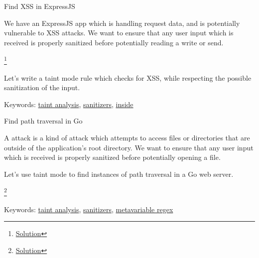 \documentclass[aspectratio=169, handout]{beamer}
\newenvironment{exercisePage}[1]{
  \begin{minipage}[t][0.4in][t]{\textwidth}
    \Large \term{Exercise:} #1
  \end{minipage}
  \begin{minipage}[t][2.6in][t]{\textwidth}
}{
  \end{minipage}
}
\newcommand\blfootnote[1]{
    \begingroup
    \renewcommand\thefootnote{}\footnote{#1}
    \addtocounter{footnote}{-1}
    \endgroup
}
\newcommand\solutionLink[1]{
  \blfootnote{\color{blue}\href{#1}{Solution}}
}
\newcommand\patternInsideLink[1][]{{\color{blue}\href{https://semgrep.dev/docs/writing-rules/rule-syntax\#pattern-inside}{inside}}}
\newcommand\metavariableRegexLink[1][]{{\color{blue}\href{https://semgrep.dev/docs/writing-rules/rule-syntax\#metavariable-regex}{metavariable regex}}}
\newcommand\taintLink[1][]{{\color{blue}\href{https://semgrep.dev/docs/writing-rules/data-flow/taint-mode}{taint analysis}}}
\newcommand\sanitizerLink[1][]{{\color{blue}\href{https://semgrep.dev/docs/writing-rules/data-flow/taint-mode\#sanitizers}{sanitizers}}}
\begin{document}
\begin{frame}[fragile]
  \begin{exercisePage}{Find XSS in ExpressJS}

  We have an ExpressJS app which is handling request data, and is potentially vulnerable
  to XSS attacks. We want to ensure that any user input which is received is properly
  sanitized before potentially reading a write or send.
  \solutionLink{https://semgrep.dev/playground/r/JDUNYAr/semgrep.express-taint-solution}

  \vspace{\fill}

  Let's write a taint mode rule which checks for XSS, while respecting the possible
  sanitization of the input.

  \vspace{\fill}

  Keywords: \taintLink, \sanitizerLink, \patternInsideLink
  \end{exercisePage}
\end{frame}

\begin{frame}[fragile]
  \begin{exercisePage}{Find path traversal in Go}

  A  attack is a kind of attack which attempts to access files
  or directories that are outside of the application's root directory. We want to
  ensure that any user input which is received is properly sanitized before potentially
  opening a file.

  \vspace{\fill}

  Let's use taint mode to find instances of path traversal in a Go web server.
  \solutionLink{https://semgrep.dev/playground/r/5rUd20G/semgrep.net-http-path-traversal-taint-solution}

  \vspace{\fill}

  Keywords: \taintLink, \sanitizerLink, \metavariableRegexLink
  \end{exercisePage}
\end{frame}

\end{document}
